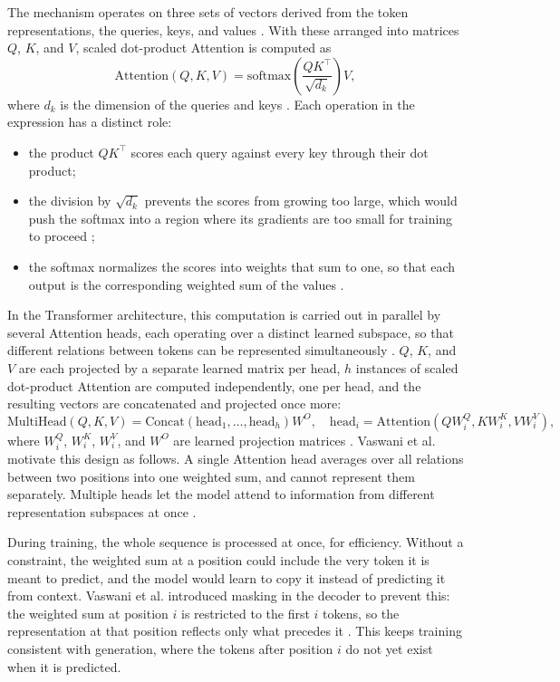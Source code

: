 The mechanism operates on three sets of vectors derived from the token representations, the queries, keys, and values \cite{vaswaniAttentionAllYou2023}. With these arranged into matrices $Q$, $K$, and $V$, scaled dot-product Attention is computed as
\begin{equation}
    \mathrm{Attention}(Q, K, V) = \mathrm{softmax}\!\left(\frac{QK^\top}{\sqrt{d_k}}\right) V ,
\end{equation}
where $d_k$ is the dimension of the queries and keys \cite{vaswaniAttentionAllYou2023}. Each operation in the expression has a distinct role:
\begin{itemize}
    \item the product $QK^\top$ scores each query against every key through their dot product;
    \item the division by $\sqrt{d_k}$ prevents the scores from growing too large, which would push the softmax into a region where its gradients are too small for training to proceed \cite{vaswaniAttentionAllYou2023};
    \item the softmax normalizes the scores into weights that sum to one, so that each output is the corresponding weighted sum of the values \cite{vaswaniAttentionAllYou2023}.
\end{itemize}
In the Transformer architecture, this computation is carried out in parallel by several Attention heads, each operating over a distinct learned subspace, so that different relations between tokens can be represented simultaneously \cite{vaswaniAttentionAllYou2023}. $Q$, $K$, and $V$ are each projected by a separate learned matrix per head, $h$ instances of scaled dot-product Attention are computed independently, one per head, and the resulting vectors are concatenated and projected once more:
\begin{equation}
    \mathrm{MultiHead}(Q, K, V) = \mathrm{Concat}(\mathrm{head}_1, \ldots, \mathrm{head}_h) W^O, \quad \mathrm{head}_i = \mathrm{Attention}(Q W_i^Q, K W_i^K, V W_i^V),
\end{equation}
where $W_i^Q$, $W_i^K$, $W_i^V$, and $W^O$ are learned projection matrices \cite{vaswaniAttentionAllYou2023}. Vaswani et al. motivate this design as follows. A single Attention head averages over all relations between two positions into one weighted sum, and cannot represent them separately. Multiple heads let the model attend to information from different representation subspaces at once \cite{vaswaniAttentionAllYou2023}.

During training, the whole sequence is processed at once, for efficiency. Without a constraint, the weighted sum at a position could include the very token it is meant to predict, and the model would learn to copy it instead of predicting it from context. Vaswani et al. introduced masking in the decoder to prevent this: the weighted sum at position $i$ is restricted to the first $i$ tokens, so the representation at that position reflects only what precedes it \cite{vaswaniAttentionAllYou2023}. This keeps training consistent with generation, where the tokens after position $i$ do not yet exist when it is predicted.

